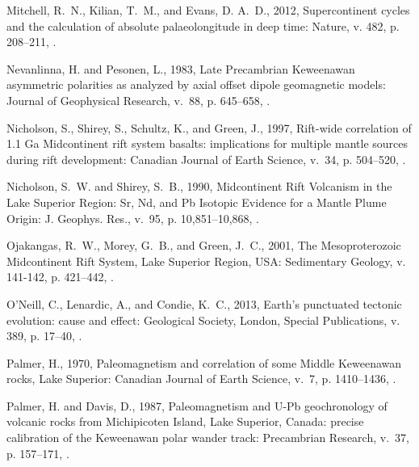 \documentclass[11pt,letterpaper]{article}
\begin{document}
\begin{thebibliography}{153}
Mitchell, R.~N., Kilian, T.~M., and Evans, D. A.~D., 2012, Supercontinent
  cycles and the calculation of absolute palaeolongitude in deep time: Nature,
  v. 482, p. 208--211, .

Nevanlinna, H. and Pesonen, L., 1983, Late {P}recambrian {K}eweenawan
  asymmetric polarities as analyzed by axial offset dipole geomagnetic models:
  Journal of Geophysical Research, v.~88, p. 645--658,
  .

Nicholson, S., Shirey, S., Schultz, K., and Green, J., 1997, Rift-wide
  correlation of 1.1 {G}a {M}idcontinent rift system basalts: implications for
  multiple mantle sources during rift development: Canadian Journal of Earth
  Science, v.~34, p. 504--520, .

Nicholson, S.~W. and Shirey, S.~B., 1990, {Midcontinent Rift Volcanism in the
  Lake Superior Region: Sr, Nd, and Pb Isotopic Evidence for a Mantle Plume
  Origin}: J. Geophys. Res., v.~95, p. 10,851--10,868,
  .

Ojakangas, R.~W., Morey, G.~B., and Green, J.~C., 2001, {The Mesoproterozoic
  Midcontinent Rift System, Lake Superior Region, USA}: Sedimentary Geology, v.
  141-142, p. 421--442, .

O'Neill, C., Lenardic, A., and Condie, K.~C., 2013, Earth's punctuated tectonic
  evolution: cause and effect: Geological Society, London, Special
  Publications, v. 389, p. 17--40, .

Palmer, H., 1970, Paleomagnetism and correlation of some {M}iddle {K}eweenawan
  rocks, {L}ake {S}uperior: Canadian Journal of Earth Science, v.~7, p.
  1410--1436, .

Palmer, H. and Davis, D., 1987, Paleomagnetism and {U-Pb} geochronology of
  volcanic rocks from {M}ichipicoten {I}sland, {L}ake {S}uperior, {C}anada:
  precise calibration of the {K}eweenawan polar wander track: Precambrian
  Research, v.~37, p. 157--171, .


\end{thebibliography}
\end{document}
